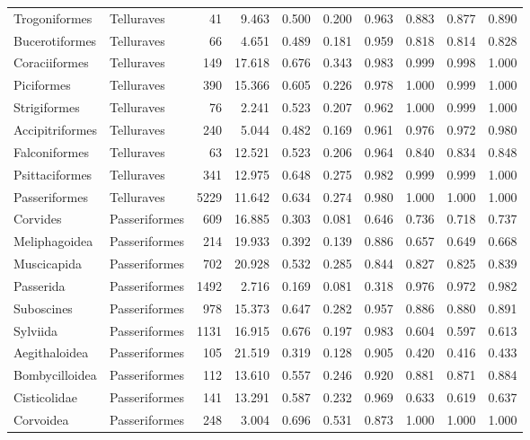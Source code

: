 \begin{longtable}{llrrrrrrrr}
  Trogoniformes & Telluraves &   41 & 9.463 & 0.500 & 0.200 & 0.963 & 0.883 & 0.877 & 0.890 \\ 
  Bucerotiformes & Telluraves &   66 & 4.651 & 0.489 & 0.181 & 0.959 & 0.818 & 0.814 & 0.828 \\ 
  Coraciiformes & Telluraves &  149 & 17.618 & 0.676 & 0.343 & 0.983 & 0.999 & 0.998 & 1.000 \\ 
  Piciformes & Telluraves &  390 & 15.366 & 0.605 & 0.226 & 0.978 & 1.000 & 0.999 & 1.000 \\ 
  Strigiformes & Telluraves &   76 & 2.241 & 0.523 & 0.207 & 0.962 & 1.000 & 0.999 & 1.000 \\ 
  Accipitriformes & Telluraves &  240 & 5.044 & 0.482 & 0.169 & 0.961 & 0.976 & 0.972 & 0.980 \\ 
  Falconiformes & Telluraves &   63 & 12.521 & 0.523 & 0.206 & 0.964 & 0.840 & 0.834 & 0.848 \\ 
  Psittaciformes & Telluraves &  341 & 12.975 & 0.648 & 0.275 & 0.982 & 0.999 & 0.999 & 1.000 \\ 
  Passeriformes & Telluraves & 5229 & 11.642 & 0.634 & 0.274 & 0.980 & 1.000 & 1.000 & 1.000 \\ 
  Corvides & Passeriformes &  609 & 16.885 & 0.303 & 0.081 & 0.646 & 0.736 & 0.718 & 0.737 \\ 
  Meliphagoidea & Passeriformes &  214 & 19.933 & 0.392 & 0.139 & 0.886 & 0.657 & 0.649 & 0.668 \\ 
  Muscicapida & Passeriformes &  702 & 20.928 & 0.532 & 0.285 & 0.844 & 0.827 & 0.825 & 0.839 \\ 
  Passerida & Passeriformes & 1492 & 2.716 & 0.169 & 0.081 & 0.318 & 0.976 & 0.972 & 0.982 \\ 
  Suboscines & Passeriformes &  978 & 15.373 & 0.647 & 0.282 & 0.957 & 0.886 & 0.880 & 0.891 \\ 
  Sylviida & Passeriformes & 1131 & 16.915 & 0.676 & 0.197 & 0.983 & 0.604 & 0.597 & 0.613 \\ 
  Aegithaloidea & Passeriformes &  105 & 21.519 & 0.319 & 0.128 & 0.905 & 0.420 & 0.416 & 0.433 \\ 
  Bombycilloidea & Passeriformes &  112 & 13.610 & 0.557 & 0.246 & 0.920 & 0.881 & 0.871 & 0.884 \\ 
  Cisticolidae & Passeriformes &  141 & 13.291 & 0.587 & 0.232 & 0.969 & 0.633 & 0.619 & 0.637 \\ 
  Corvoidea & Passeriformes &  248 & 3.004 & 0.696 & 0.531 & 0.873 & 1.000 & 1.000 & 1.000 \\ 

\end{longtable}
